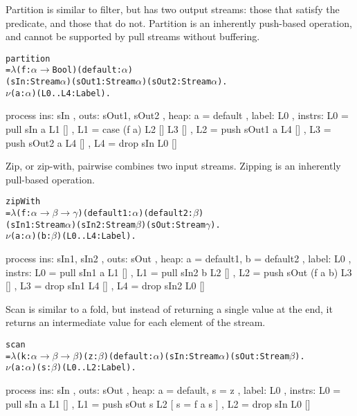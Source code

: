 \newpage

Partition is similar to filter, but has two output streams: those that satisfy the predicate, and those that do not. Partition is an inherently push-based operation, and cannot be supported by pull streams without buffering.

\begin{alltt}
    partition 
        = \(\lambda\) (f : \(\alpha \to\) Bool) (default : \(\alpha\))
            (sIn: Stream \(\alpha\)) (sOut1: Stream \(\alpha\)) (sOut2: Stream \(\alpha\)). 
          \(\nu\) (a: \(\alpha\)) (L0..L4: Label).
\end{alltt}
\begin{code}
         process
         { ins:    { sIn }
         , outs:   { sOut1, sOut2 }
         , heap:   { a = default }
         , label:  L0
         , instrs: { L0 = pull sIn   a    L1 []
                   , L1 = case    (f a)   L2 []  L3 []
                   , L2 = push sOut1 a    L4 []
                   , L3 = push sOut2 a    L4 []
                   , L4 = drop sIn        L0 [] } }
\end{code}

Zip, or zip-with, pairwise combines two input streams.
Zipping is an inherently pull-based operation.

\begin{alltt}
    zipWith 
        = \(\lambda\) (f : \(\alpha \to \beta \to \gamma\)) (default1 : \(\alpha\)) (default2 : \(\beta\))
            (sIn1: Stream \(\alpha\)) (sIn2: Stream \(\beta\)) (sOut: Stream \(\gamma\)). 
          \(\nu\) (a: \(\alpha\)) (b : \(\beta\)) (L0..L4: Label).
\end{alltt}
\begin{code}
         process
         { ins:    { sIn1, sIn2 }
         , outs:   { sOut }
         , heap:   { a = default1, b = default2 }
         , label:  L0
         , instrs: { L0 = pull sIn1 a       L1 []
                   , L1 = pull sIn2 b       L2 []
                   , L2 = push sOut (f a b) L3 []
                   , L3 = drop sIn1         L4 []
                   , L4 = drop sIn2         L0 [] } }
\end{code}

Scan is similar to a fold, but instead of returning a single value at the end, it returns an intermediate value for each element of the stream.

\begin{alltt}
    scan 
        = \(\lambda\) (k : \(\alpha \to \beta \to \beta\)) (z : \(\beta\)) (default : \(\alpha\)) (sIn: Stream \(\alpha\)) (sOut: Stream \(\beta\)).
          \(\nu\) (a: \(\alpha\)) (s : \(\beta\)) (L0..L2: Label).
\end{alltt}
\begin{code}
         process
         { ins:    { sIn  }
         , outs:   { sOut }
         , heap:   { a = default, s = z }
         , label:  L0
         , instrs: { L0 = pull sIn  a       L1 []
                   , L1 = push sOut s       L2 [ s = f a s ]
                   , L2 = drop sIn          L0 [] } }
\end{code}

